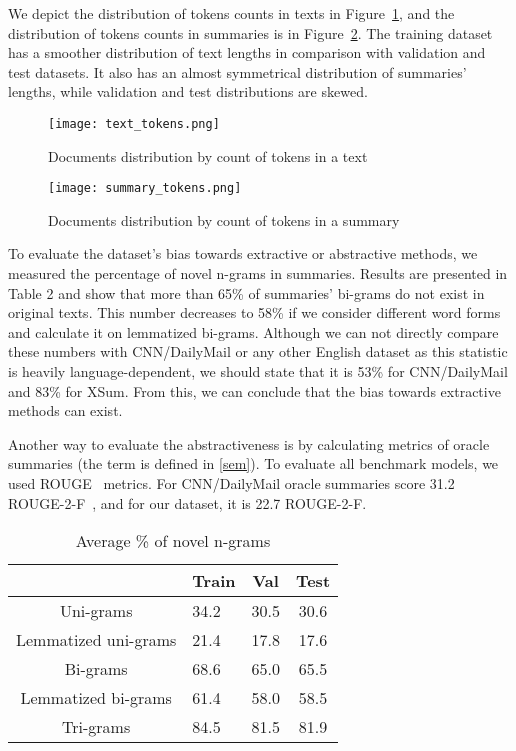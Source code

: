 \documentclass[runningheads]{llncs}
\begin{document}
We depict the distribution of tokens counts in texts in Figure~\ref{fig1}, and the distribution of tokens counts in summaries is in Figure~\ref{fig2}. The training dataset has a smoother distribution of text lengths in comparison with validation and test datasets. It also has an almost symmetrical distribution of summaries' lengths, while validation and test distributions are skewed.

\begin{figure}
\texttt{[image: text\_tokens.png]}
\caption{Documents distribution by count of tokens in a text}
\label{fig1}
\end{figure}

\begin{figure}
\texttt{[image: summary\_tokens.png]}
\caption{Documents distribution by count of tokens in a summary} \label{fig2}
\end{figure}

To evaluate the dataset's bias towards extractive or abstractive methods, we measured the percentage of novel n-grams in summaries. Results are presented in Table 2 and show that more than 65\% of summaries' bi-grams do not exist in original texts. This number decreases to 58\% if we consider different word forms and calculate it on lemmatized bi-grams. Although we can not directly compare these numbers with CNN/DailyMail or any other English dataset as this statistic is heavily language-dependent, we should state that it is 53\% for CNN/DailyMail and 83\% for XSum. From this, we can conclude that the bias towards extractive methods can exist.

Another way to evaluate the abstractiveness is by calculating metrics of oracle summaries (the term is defined in \ref{sem}). To evaluate all benchmark models, we used ROUGE~\cite{rouge} metrics. For CNN/DailyMail oracle summaries score 31.2 ROUGE-2-F~\cite{presumm}, and for our dataset, it is 22.7 ROUGE-2-F.

\begin{table}[htbp]
\caption{Average \% of novel n-grams}\label{tab2}
\centering
\begin{tabular}{|c|C{1.4cm}|c|c|}\hline
& Train & \phantom{ha} Val \phantom{ck} &\phantom{ha} Test \phantom{ck}\\\hline
Uni-grams & 34.2 & 30.5 & 30.6 \\\hline
Lemmatized uni-grams & 21.4 & 17.8 & 17.6\\\hline
Bi-grams & 68.6 & 65.0 & 65.5 \\\hline
Lemmatized bi-grams & 61.4 & 58.0 & 58.5 \\\hline
Tri-grams & 84.5 & 81.5 & 81.9 \\\hline
\end{tabular}
\end{table}
\end{document}
